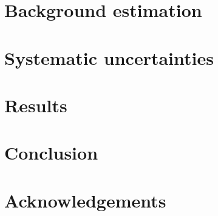 \documentclass[PAPER, atlasdraft=false, cernpreprint, UKenglish]{atlasdoc}
\begin{document}
\section{Background estimation}
\label{sec:bkgs}



\section{Systematic uncertainties}
\label{sec:Systs}


\section{Results}
\label{sec:result}



\FloatBarrier

\section{Conclusion}
\label{sec:conclusion}



\section*{Acknowledgements}

% 
\end{document}
